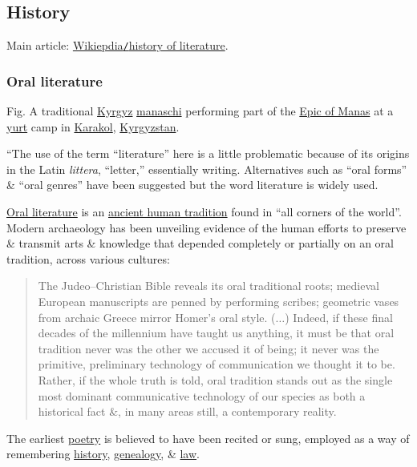 \documentclass[oneside]{book}
\numberwithin{equation}{section}
\begin{document}
\subsection{History}
Main article: \href{https://en.wikipedia.org/wiki/History_of_literature}{Wikiepdia\texttt{/}history of literature}.

\subsubsection{Oral literature}
\textsf{Fig. A traditional \href{https://en.wikipedia.org/wiki/Kyrgyz_people}{Kyrgyz} \href{https://en.wikipedia.org/wiki/Manaschi}{manaschi} performing part of the \href{https://en.wikipedia.org/wiki/Epic_of_Manas}{Epic of Manas} at a \href{https://en.wikipedia.org/wiki/Yurt}{yurt} camp in \href{https://en.wikipedia.org/wiki/Karakol}{Karakol}, \href{https://en.wikipedia.org/wiki/Kyrgyzstan}{Kyrgyzstan}.}

``The use of the term ``literature'' here is a little problematic because of its origins in the Latin \textit{littera}, ``letter,'' essentially writing. Alternatives such as ``oral forms'' \& ``oral genres'' have been suggested but the word literature is widely used.

\href{https://en.wikipedia.org/wiki/Oral_literature}{Oral literature} is an \href{https://en.wikipedia.org/wiki/Oral_tradition}{ancient human tradition} found in ``all corners of the world''. Modern archaeology has been unveiling evidence of the human efforts to preserve \& transmit arts \& knowledge that depended completely or partially on an oral tradition, across various cultures:
\begin{quotation}
	The Judeo--Christian Bible reveals its oral traditional roots; medieval European manuscripts are penned by performing scribes; geometric vases from archaic Greece mirror Homer's oral style. ($\ldots$) Indeed, if these final decades of the millennium have taught us anything, it must be that oral tradition never was the other we accused it of being; it never was the primitive, preliminary technology of communication we thought it to be. Rather, if the whole truth is told, oral tradition stands out as the single most dominant communicative technology of our species as both a historical fact \&, in many areas still, a contemporary reality.
\end{quotation}
The earliest \href{https://en.wikipedia.org/wiki/Poetry}{poetry} is believed to have been recited or sung, employed as a way of remembering \href{https://en.wikipedia.org/wiki/Oral_history}{history}, \href{https://en.wikipedia.org/wiki/Genealogy}{genealogy}, \& \href{https://en.wikipedia.org/wiki/Law}{law}.
\end{document}
